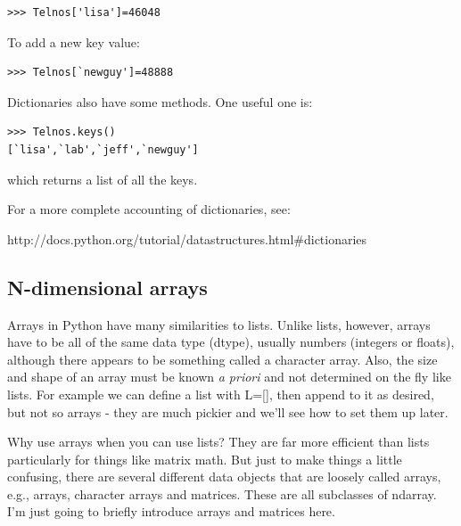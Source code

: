 \documentclass[11pt]{book}
\begin{document}
{{ \color{blue} \begin{verbatim}
>>> Telnos['lisa']=46048
\end{verbatim}}


\noindent
To add a new key value:
{ \color{blue} \begin{verbatim}
>>> Telnos[`newguy']=48888
\end{verbatim}}


\noindent
 Dictionaries also have some methods.
One useful one is:
{ \color{blue} \begin{verbatim}
>>> Telnos.keys()
[`lisa',`lab',`jeff',`newguy']
\end{verbatim}}

\noindent
which returns a list of all the keys.  

For a more complete accounting of dictionaries,  see: 

http://docs.python.org/tutorial/datastructures.html\#dictionaries



\subsection{N-dimensional arrays}

Arrays  in Python  have many similarities  to  lists.
Unlike lists, however,  arrays have to be all of the same data type (dtype), usually numbers (integers or floats), although there appears to be something called a character array.  Also, the size and shape of an array must be known {\it a priori} and not determined on the fly like lists. For example we can define a list with {\color{blue}L=[]}, then append to it as desired, but not so arrays - they are much pickier and we'll see how to set them up later.  

Why use arrays when you can use lists?  They are far more efficient than lists particularly for things like matrix math.   But just to make things a little confusing, there are  several different data objects that are loosely called arrays, e.g., arrays, character arrays and matrices.  These are all subclasses of ndarray.  I'm just going to briefly introduce arrays and matrices here.  

}
\end{document}
